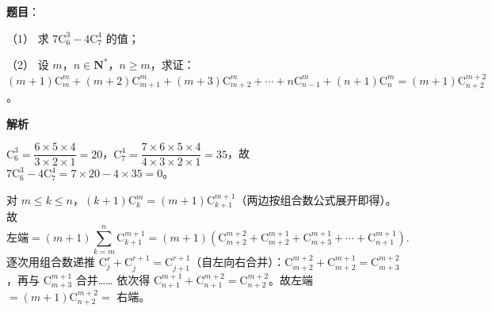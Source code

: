 \begin{answer}

\textbf{题目}：

（1） 求 \(7\mathrm{C}_6^3-4\mathrm{C}_7^4\) 的值；

（2） 设 \(m\)，\(n\in\mathbf{N}^{*}\)，\(n\geqslant m\)，求证：\((m+1)\mathrm{C}_m^m+(m+2)\mathrm{C}_{m+1}^m+(m+3)\mathrm{C}_{m+2}^m+\cdots+n\mathrm{C}_{n-1}^m+(n+1)\mathrm{C}_n^m=(m+1)\mathrm{C}_{n+2}^{m+2}\)。

\textbf{解析}


\(\mathrm{C}_6^3=\dfrac{6\times5\times4}{3\times2\times1}=20\)，\(\mathrm{C}_7^4=\dfrac{7\times6\times5\times4}{4\times3\times2\times1}=35\)，故 \(7\mathrm{C}_6^3-4\mathrm{C}_7^4=7\times20-4\times35=0\)。


对 \(m\leqslant k\leqslant n\)，\((k+1)\mathrm{C}_k^m=(m+1)\mathrm{C}_{k+1}^{m+1}\)（两边按组合数公式展开即得）。故
\nopagebreak[4]
\[
\text{左端}=(m+1)\sum_{k=m}^{n}\mathrm{C}_{k+1}^{m+1}
=(m+1)\left(\mathrm{C}_{m+2}^{m+2}+\mathrm{C}_{m+2}^{m+1}+\mathrm{C}_{m+3}^{m+1}+\cdots+\mathrm{C}_{n+1}^{m+1}\right).
\]
逐次用组合数递推 \(\mathrm{C}_j^{r}+\mathrm{C}_j^{r+1}=\mathrm{C}_{j+1}^{r+1}\)（自左向右合并）：\(\mathrm{C}_{m+2}^{m+2}+\mathrm{C}_{m+2}^{m+1}=\mathrm{C}_{m+3}^{m+2}\)，再与 \(\mathrm{C}_{m+3}^{m+1}\) 合并…… 依次得 \(\mathrm{C}_{n+1}^{m+1}+\mathrm{C}_{n+1}^{m+2}=\mathrm{C}_{n+2}^{m+2}\)。故左端 \(=(m+1)\mathrm{C}_{n+2}^{m+2}=\) 右端。



\end{answer}